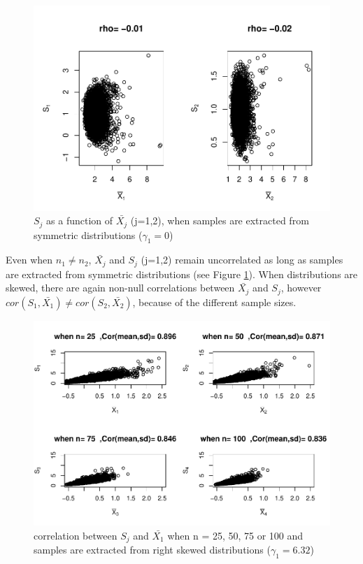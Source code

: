 \documentclass[
  man]{apa6}
\begin{document}
\begin{figure}
\centering
\includegraphics{Correlations-between-the-sample-means-difference-and-standardizers-of-all-estimators,-and-implications-on-biases-and-variances-of-all-estimators_files/figure-latex/pltSDMEANHomunbalsym-1.pdf}
\caption{\label{fig:pltSDMEANHomunbalsym}\(S_j\) as a function of \(\bar{X_j}\) (j=1,2), when samples are extracted from symmetric distributions (\(\gamma_1 = 0\))}
\end{figure}

Even when \(n_1 \neq n_2\), \(\bar{X_j}\) and \(S_j\) (j=1,2) remain uncorrelated as long as samples are extracted from symmetric distributions (see Figure \ref{fig:pltSDMEANHomunbalsym}). When distributions are skewed, there are again non-null correlations between \(\bar{X_j}\) and \(S_j\), however \(cor(S_1,\bar{X_1}) \neq cor(S_2,\bar{X_2})\), because of the different sample sizes.

\begin{figure}
\centering
\includegraphics{Correlations-between-the-sample-means-difference-and-standardizers-of-all-estimators,-and-implications-on-biases-and-variances-of-all-estimators_files/figure-latex/Homunbalcorasafctofn1-1.pdf}
\caption{\label{fig:Homunbalcorasafctofn1}correlation between \(S_j\) and \(\bar{X_1}\) when n = 25, 50, 75 or 100 and samples are extracted from right skewed distributions (\(\gamma_1 = 6.32\))}
\end{figure}
\end{document}

